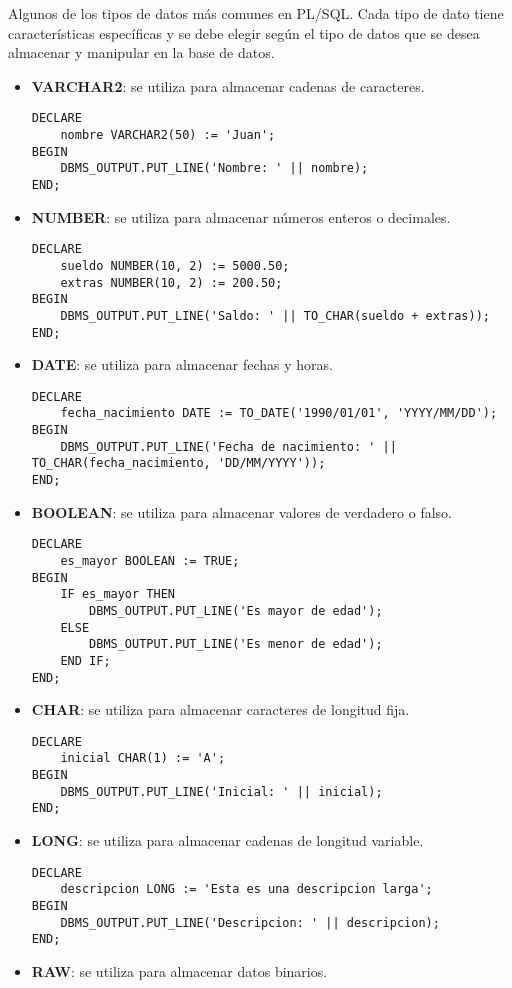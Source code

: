 \documentclass[executivepaper]{article}
\begin{document}
Algunos de los tipos de datos más comunes en PL/SQL. Cada tipo de dato tiene características específicas y se debe elegir según el tipo de datos que se desea almacenar y manipular en la base de datos.

\begin{itemize}
    \item \textbf{VARCHAR2}: se utiliza para almacenar cadenas de caracteres.
\begin{lstlisting}
DECLARE
    nombre VARCHAR2(50) := 'Juan';
BEGIN
    DBMS_OUTPUT.PUT_LINE('Nombre: ' || nombre);
END;    
\end{lstlisting}
    \item \textbf{NUMBER}: se utiliza para almacenar números enteros o decimales.
\begin{lstlisting}
DECLARE
    sueldo NUMBER(10, 2) := 5000.50;
    extras NUMBER(10, 2) := 200.50;
BEGIN
    DBMS_OUTPUT.PUT_LINE('Saldo: ' || TO_CHAR(sueldo + extras));
END;
\end{lstlisting}
    \item \textbf{DATE}: se utiliza para almacenar fechas y horas.
\begin{lstlisting}
DECLARE
    fecha_nacimiento DATE := TO_DATE('1990/01/01', 'YYYY/MM/DD');
BEGIN
    DBMS_OUTPUT.PUT_LINE('Fecha de nacimiento: ' || TO_CHAR(fecha_nacimiento, 'DD/MM/YYYY'));
END;
\end{lstlisting}
    \item \textbf{BOOLEAN}: se utiliza para almacenar valores de verdadero o falso.
\begin{lstlisting}
DECLARE
    es_mayor BOOLEAN := TRUE;
BEGIN
    IF es_mayor THEN
        DBMS_OUTPUT.PUT_LINE('Es mayor de edad');
    ELSE
        DBMS_OUTPUT.PUT_LINE('Es menor de edad');
    END IF;
END;
\end{lstlisting}
    \item \textbf{CHAR}: se utiliza para almacenar caracteres de longitud fija.
\begin{lstlisting}
DECLARE
    inicial CHAR(1) := 'A';
BEGIN
    DBMS_OUTPUT.PUT_LINE('Inicial: ' || inicial);
END;    
\end{lstlisting}
    \item \textbf{LONG}: se utiliza para almacenar cadenas de longitud variable.
\begin{lstlisting}
DECLARE
    descripcion LONG := 'Esta es una descripcion larga';
BEGIN
    DBMS_OUTPUT.PUT_LINE('Descripcion: ' || descripcion);
END;    
\end{lstlisting}
    \item \textbf{RAW}: se utiliza para almacenar datos binarios.

\end{itemize}
\end{document}
